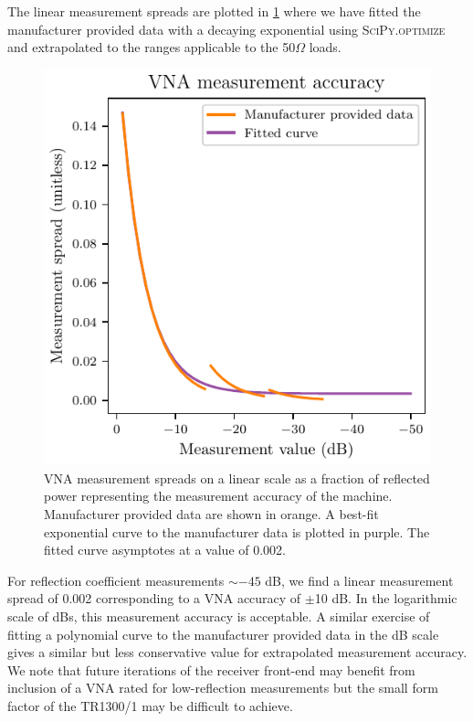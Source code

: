 The linear measurement spreads are plotted in \cref{fig:vna_acc} where we have fitted the manufacturer provided data with a decaying exponential using \textsc{SciPy.optimize} and extrapolated to the ranges applicable to the 50$\Omega$ loads. \begin{figure}
    \centering
    \includegraphics{linear_vna_accuracy}
    \caption{VNA measurement spreads on a linear scale as a fraction of reflected power representing the measurement accuracy of the machine. Manufacturer provided data are shown in orange. A best-fit exponential curve to the manufacturer data is plotted in purple. The fitted curve asymptotes at a value of 0.002.}
    \label{fig:vna_acc}
\end{figure}
For reflection coefficient measurements $\sim -45$ dB, we find a linear measurement spread of 0.002 corresponding to a VNA accuracy of $\pm$10 dB. In the logarithmic scale of dBs, this measurement accuracy is acceptable. A similar exercise of fitting a polynomial curve to the manufacturer provided data in the dB scale gives a similar but less conservative value for extrapolated measurement accuracy. We note that future iterations of the receiver front-end may benefit from inclusion of a VNA rated for low-reflection measurements but the small form factor of the TR1300/1 may be difficult to achieve.

